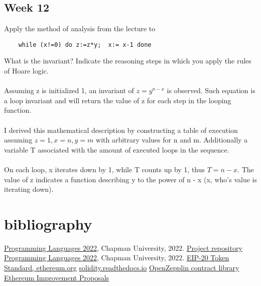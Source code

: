 \documentclass{article}
\theoremstyle{theorem}
\theoremstyle{definition}
\theoremstyle{remark}
\begin{document}
\subsection{Week 12}
Apply the method of analysis from the lecture to
\begin{verbatim}
    while (x!=0) do z:=z*y;  x:= x-1 done
\end{verbatim}

What is the invariant? Indicate the reasoning steps in which you apply the rules of Hoare logic.
\\\\
Assuming z is initialized 1, an invariant of $z=y^{n-x}$ is observed. Such equation is a loop invariant and will return the value of z for each step in the looping function. 
\\\\
I derived this mathematical description by constructing a table of execution assuming $z = 1, x = n, y = m$ with arbitrary values for n and m. Additionally a variable T associated with the amount of executed loops in the sequence.
\\\\
On each loop, x iterates down by 1, while T counts up by 1, thus $T = n - x$. The value of z indicates a function describing y to the power of n - x (x, who's value is iterating down). 





\section{bibliography}\label{conclusions}


\begin{thebibliography}{99}
 \href{https://github.com/alexhkurz/programming-languages-2022/blob/main/README.md}{Programming Languages 2022}, Chapman University, 2022.
\href{https://github.com/tylew/354-Programming-Languages/}{Project repository} \href{https://github.com/alexhkurz/programming-languages-2022/blob/main/README.md}{Programming Languages 2022}, Chapman University, 2022.
 \href{https://eips.ethereum.org/EIPS/eip-20#abstract}{EIP-20 Token Standard, ethereum.org}
 \href{http://solidity.readthedocs.io}{ solidity.readthedocs.io}
 \href{https://github.com/OpenZeppelin/openzeppelin-contracts}{OpenZepplin contract library}
\href{https://eips.ethereum.org/}{Ethereum Improvement Proposals}

\end{thebibliography}
\end{document}
